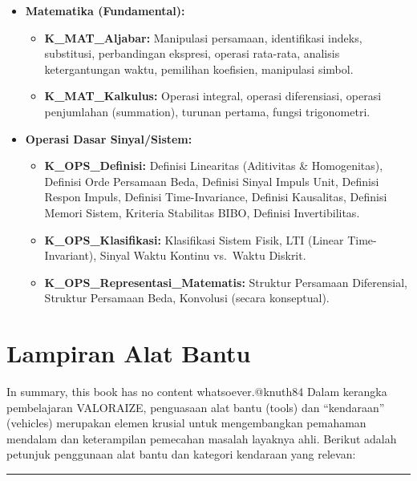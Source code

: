 \documentclass[
  letterpaper,
  DIV=11,
  numbers=noendperiod]{scrreprt}
\providecommand{\tightlist}{%
  \setlength{\itemsep}{0pt}\setlength{\parskip}{0pt}}
\begin{document}
\begin{itemize}
\tightlist
\item
  \textbf{Matematika (Fundamental):}

  \begin{itemize}
  \tightlist
  \item
    \textbf{K\_MAT\_Aljabar:} Manipulasi persamaan, identifikasi indeks,
    substitusi, perbandingan ekspresi, operasi rata-rata, analisis
    ketergantungan waktu, pemilihan koefisien, manipulasi simbol.
  \item
    \textbf{K\_MAT\_Kalkulus:} Operasi integral, operasi diferensiasi,
    operasi penjumlahan (summation), turunan pertama, fungsi
    trigonometri.
  \end{itemize}
\item
  \textbf{Operasi Dasar Sinyal/Sistem:}

  \begin{itemize}
  \tightlist
  \item
    \textbf{K\_OPS\_Definisi:} Definisi Linearitas (Aditivitas \&
    Homogenitas), Definisi Orde Persamaan Beda, Definisi Sinyal Impuls
    Unit, Definisi Respon Impuls, Definisi Time-Invariance, Definisi
    Kausalitas, Definisi Memori Sistem, Kriteria Stabilitas BIBO,
    Definisi Invertibilitas.
  \item
    \textbf{K\_OPS\_Klasifikasi:} Klasifikasi Sistem Fisik, LTI (Linear
    Time-Invariant), Sinyal Waktu Kontinu vs.~Waktu Diskrit.
  \item
    \textbf{K\_OPS\_Representasi\_Matematis:} Struktur Persamaan
    Diferensial, Struktur Persamaan Beda, Konvolusi (secara konseptual).
  \end{itemize}
\end{itemize}


\chapter{Lampiran Alat Bantu}\label{lampiran-alat-bantu}

In summary, this book has no content whatsoever.@knuth84 Dalam kerangka
pembelajaran VALORAIZE, penguasaan alat bantu (tools) dan ``kendaraan''
(vehicles) merupakan elemen krusial untuk mengembangkan pemahaman
mendalam dan keterampilan pemecahan masalah layaknya ahli. Berikut
adalah petunjuk penggunaan alat bantu dan kategori kendaraan yang
relevan:

\begin{center}\rule{0.5\linewidth}{0.5pt}\end{center}
\end{document}
